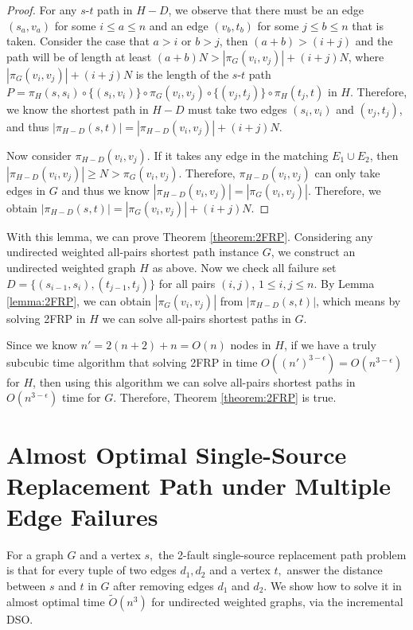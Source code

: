 \documentclass[11pt]{article}
\theoremstyle{plain}
\theoremstyle{definition}
\newcommand{\too}[1]{\tilde{O}({#1})}
\newcommand{\set}[1]{\{ #1 \}}
\newcommand{\hg}[3]{\pi_{H-#3}\left(#1,#2\right)}
\begin{document}
\begin{proof}


    For any $s$-$t$ path in $H-D$, we observe that there must be an edge $(s_{a},v_{a})$ for some $i \leq a \leq n$ and an edge $(v_{b},t_{b})$ for some $j \leq b \leq n$ that is taken. Consider the case that $a>i$ or $b>j$, then $(a+b) > (i+j)$ and the path will be of length at least $(a+b)N > |\pi_G(v_i,v_j)| + (i+j)N$, where $|\pi_G(v_i,v_j)| + (i+j)N$ is the length of the $s$-$t$ path $P = \pi_H(s,s_{i}) \circ \set{(s_i,v_i)} \circ \pi_G(v_i,v_j) \circ \set{(v_j,t_j)} \circ \pi_H(t_j,t)$ in $H$. Therefore, we know the shortest path in $H-D$ must take two edges $(s_{i},v_{i})$ and $(v_{j},t_{j})$, and thus $|\hg{s}{t}{D}| = |\hg{v_i}{v_j}{D}| + (i+j)N$.

    Now consider $\hg{v_i}{v_j}{D}$. If it takes any edge in the matching $E_1 \cup E_2$, then $|\hg{v_i}{v_j}{D}| \geq N > \pi_G(v_i,v_j)$. Therefore, $\hg{v_i}{v_j}{D}$ can only take edges in $G$ and thus we know $|\hg{v_i}{v_j}{D}| = |\pi_G(v_i,v_j)|$. Therefore, we obtain $|\hg{s}{t}{D}| = |\pi_G(v_i,v_j)| + (i+j)N$.
    
\end{proof}

With this lemma, we can prove Theorem \ref{theorem:2FRP}. Considering any undirected weighted all-pairs shortest path instance $G$, we construct an undirected weighted graph $H$ as above. Now we check all failure set $D=\set{(s_{i-1},s_{i}),(t_{j-1},t_{j})}$ for all pairs $(i,j)$, $1 \leq i,j \leq n$. By Lemma \ref{lemma:2FRP}, we can obtain $|\pi_G(v_i,v_j)|$ from $|\hg{s}{t}{D}|$, which means by solving 2FRP in $H$ we can solve all-pairs shortest paths in $G$.

Since we know $n' = 2(n+2)+n=O(n)$ nodes in $H$, if we have a truly subcubic time algorithm that solving 2FRP in time $O((n')^{3-\epsilon}) = O(n^{3-\epsilon})$ for $H$, then using this algorithm we can solve all-pairs shortest paths in $O(n^{3-\epsilon})$ time for $G$. Therefore, Theorem \ref{theorem:2FRP} is true. \section{Almost Optimal Single-Source Replacement Path under Multiple Edge Failures}\label{sec:2ssrp}

For a graph $G$ and a vertex $s,$ the 2-fault single-source replacement path problem is that for every tuple of two edges $d_1,d_2$ and a vertex $t,$ answer the distance between $s$ and $t$ in $G$ after removing edges $d_1$ and $d_2.$ We show how to solve it in almost optimal time $\too{n^3}$ for undirected weighted graphs, via the incremental DSO.
\end{document}

